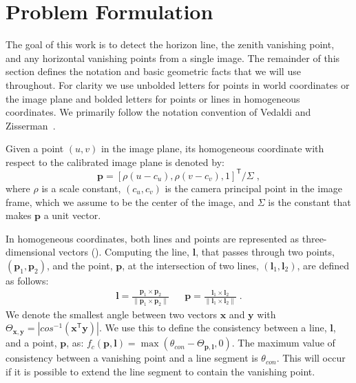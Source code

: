 \section{Problem Formulation}
\label{sec:problem}

%

The goal of this work is to detect the horizon line, the zenith
vanishing point, and any horizontal vanishing points from a single
image. The remainder of this section defines the notation and basic
geometric facts that we will use throughout.  For clarity we use
unbolded letters for points in world coordinates or the image plane
and bolded letters for points or lines in homogeneous coordinates.  We
primarily follow the notation convention of Vedaldi and
Zisserman~\cite{selfsketch2012}.

Given a point $(u,v)$ in the image plane, its homogeneous coordinate
with respect to the calibrated image plane is denoted by:
\begin{displaymath}
  \mathbf{p} = [\rho(u-c_u), \rho(v-c_v), 1]^\mathsf{T} / \Sigma \; ,
\end{displaymath}
where $\rho$ is a scale constant, $(c_u, c_v)$ is the camera principal
point in the image frame, which we assume to be the center of the
image, and $\Sigma$ is the constant that makes $\mathbf{p}$ a unit
vector.

In homogeneous coordinates, both lines and points are represented as
three-dimensional vectors (). Computing the
line, $\mathbf{l}$, that passes through two points, $(\mathbf{p}_1, \mathbf{p}_2)$, and
the point, $\mathbf{p}$, at the intersection of two lines, $(\mathbf{l}_1,
\mathbf{l}_2)$, are defined as follows:
\begin{align}
  \mathbf{l} = \frac{\mathbf{p}_1 \times \mathbf{p}_2}{\|\mathbf{p}_1 \times
    \mathbf{p}_2\|} 
  &&
  \mathbf{p} = \frac{\mathbf{l}_1 \times \mathbf{l}_2}{\|\mathbf{l}_1 \times \mathbf{l}_2\|} \; .
\end{align}
We denote the smallest angle between two vectors $\mathbf{x}$ and
$\mathbf{y}$ with $\Theta_{\mathbf{x},\mathbf{y}}
= |cos^{-1}(\mathbf{x}^\mathsf{T} \mathbf{y})|$.
We use this to define the consistency between a line, $\mathbf{l}$, and a
point,
$\mathbf{p}$, as: $f_c(\mathbf{p}, \mathbf{l}) =
\operatorname*{max}(\theta_{con} - \Theta_{\mathbf{p},\mathbf{l}}, 0)$.
The maximum value of consistency between a vanishing point and a line
segment is $\theta_{con}$. This will occur if it is possible to extend
the line segment to contain the vanishing point.

